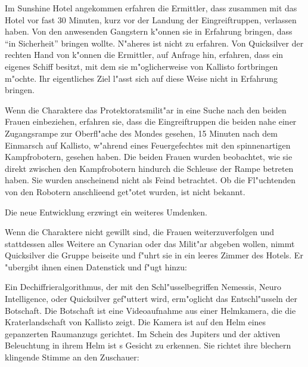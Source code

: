 Im Sunshine Hotel angekommen erfahren die Ermittler, dass \xl{} zusammen mit \ml{} das Hotel vor fast 30 Minuten, kurz vor der Landung der Eingreiftruppen, verlassen haben. Von den anwesenden Gangstern k"onnen sie in Erfahrung bringen, dass \xl{} \ml{} ``in Sicherheit'' bringen wollte. N"aheres ist nicht zu erfahren. Von Quicksilver der rechten Hand von \xl{} k"onnen die Ermittler, auf Anfrage hin, erfahren, dass \xl{} ein eigenes Schiff besitzt, mit dem sie m"oglicherweise \ml{} von Kallisto fortbringen m"ochte. Ihr eigentliches Ziel l"asst sich auf diese Weise nicht in Erfahrung bringen. 

Wenn die Charaktere das Protektoratsmilit"ar in eine Suche nach den beiden Frauen einbeziehen, erfahren sie, dass die Eingreiftruppen die beiden nahe einer Zugangsrampe zur Oberfl"ache des Mondes gesehen, 15 Minuten nach dem Einmarsch auf Kallisto, w"ahrend eines Feuergefechtes mit den spinnenartigen Kampfrobotern, gesehen haben. Die beiden Frauen wurden beobachtet, wie sie direkt zwischen den Kampfrobotern hindurch die Schleuse der Rampe betreten haben. Sie wurden anscheinend nicht als Feind betrachtet. Ob die Fl"uchtenden von den Robotern anschlie\3end get"otet wurden, ist nicht bekannt.

Die neue Entwicklung erzwingt ein weiteres Umdenken.

Wenn die Charaktere nicht gewillt sind, die Frauen weiterzuverfolgen und stattdessen alles Weitere an Cynarian oder das Milit"ar abgeben wollen, nimmt Quicksilver die Gruppe beiseite und f"uhrt sie in ein leeres Zimmer des Hotels. Er "ubergibt ihnen einen Datenstick und f"ugt hinzu: 


Ein Dechiffrieralgorithmus, der mit den Schl"usselbegriffen Nemessis, Neuro Intelligence, \xl{} oder Quicksilver gef"uttert wird, erm"oglicht das Entschl"usseln der Botschaft. Die Botschaft ist eine Videoaufnahme aus einer Helmkamera, die die Kraterlandschaft von Kallisto zeigt. Die Kamera ist auf den Helm eines gepanzerten Raumanzugs gerichtet. Im Schein des Jupiters und der aktiven Beleuchtung in ihrem Helm ist \xl{}s Gesicht zu erkennen. Sie richtet ihre blechern klingende Stimme an den Zuschauer:

